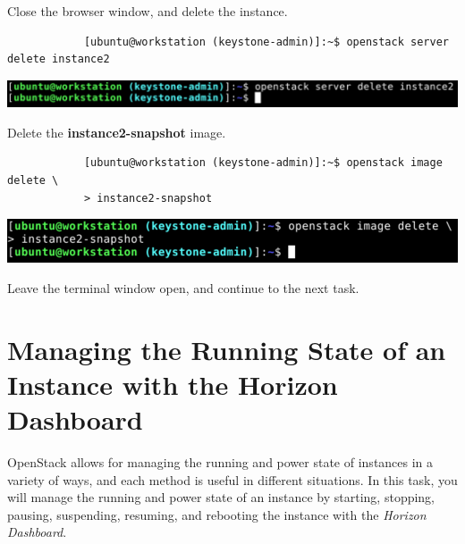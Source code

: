 \documentclass[letterpaper, 12pt]{article}
\begin{document}
\begin{enumerate}
    \begin{labstep}
        Close the browser window, and delete the instance.
        \begin{lstlisting}
            [ubuntu@workstation (keystone-admin)]:~$ openstack server delete instance2
        \end{lstlisting}

        \begin{center}
            \includegraphics[width=\linewidth]{images/part2/step17.png}
        \end{center}
    \end{labstep}

    \begin{labstep}
        Delete the \textbf{instance2-snapshot} image.
        \begin{lstlisting}
            [ubuntu@workstation (keystone-admin)]:~$ openstack image delete \
            > instance2-snapshot
        \end{lstlisting}

        \begin{center}
            \includegraphics[width=\linewidth]{images/part2/step18.png}
        \end{center}
    \end{labstep}

    \begin{labstep}
        Leave the terminal window open, and continue to the next task.
    \end{labstep}

\end{enumerate}

\section{Managing the Running State of an Instance with the Horizon Dashboard}\label{sec:managing-the-running-state-of-an-instance-with-the-horizon-dashboard}
OpenStack allows for managing the running and power state of instances in a variety of ways, and each method is useful in different situations.
In this task, you will manage the running and power state of an instance by starting, stopping, pausing, suspending, resuming, and rebooting the instance with the \textit{Horizon Dashboard}.
\end{document}
